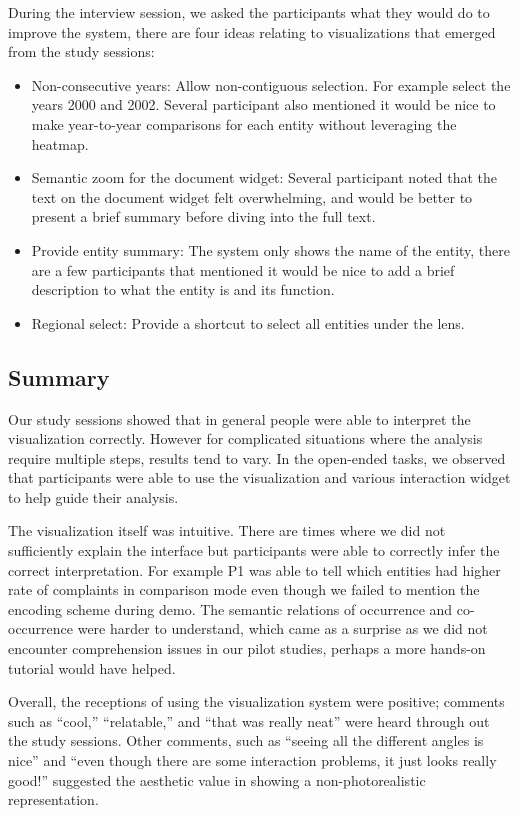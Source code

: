 During the interview session, we asked the participants what they would do to
improve the system, there are four ideas relating to visualizations that emerged
from the study sessions:
\begin{itemize}[noitemsep]
  \item Non-consecutive years: Allow non-contiguous selection. For
  example select the years 2000 and 2002. Several participant also mentioned it
  would be nice to make year-to-year comparisons for each entity without
  leveraging the heatmap.
  
  \item Semantic zoom for the document widget: Several participant noted that
  the text on the document widget felt overwhelming, and would be better to
  present a brief summary before diving into the full text.
  
  \item Provide entity summary: The system only shows the name of the entity,
  there are a few participants that mentioned it would be nice to add a brief
  description to what the entity is and its function.
  
  \item Regional select: Provide a shortcut to select all entities under the
  lens.
\end{itemize}
   
  
\subsection{Summary}
Our study sessions showed that in general people were able to interpret the
visualization correctly. However for complicated situations where the analysis
require multiple steps, results tend to vary. In the open-ended tasks, we
observed that participants were able to use the visualization and various
interaction widget to help guide their analysis.

The visualization itself was intuitive. There are times where we did not
sufficiently explain the interface but participants were able to correctly infer
the correct interpretation. For example P1 was able to tell which entities had higher rate
of complaints in comparison mode even though we failed to mention the encoding scheme during demo. 
The semantic relations of occurrence and co-occurrence were harder to understand, which 
came as a surprise as we did not encounter comprehension issues in our pilot studies, 
perhaps a more hands-on tutorial would have helped.

Overall, the receptions of using the visualization system were positive;
comments such as ``cool,'' ``relatable,'' and ``that was really neat'' were heard
through out the study sessions. Other comments, such as ``seeing all the different angles is
nice'' and ``even though there are some interaction problems, it just looks
really good!'' suggested the aesthetic value in showing a non-photorealistic \threed
representation.  
  